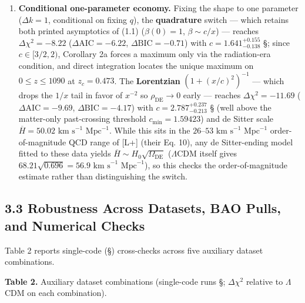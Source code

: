 \documentclass[11pt,a4paper]{article}
\begin{document}
\begin{enumerate}
\item{} {\bfseries\boldmath Conditional one-parameter economy.} Fixing the shape to one parameter ($\Delta k = 1$, conditional on fixing $q$), the {\bfseries\boldmath quadrature} switch --- which retains both printed asymptotics of (1.1) ($\beta(0) = 1$, $\beta \sim c/x$) --- reaches $\Delta\chi^2 = -8.22$ ($\Delta\text{AIC} = -6.22$, $\Delta\text{BIC} = -0.71$) with $c = 1.641^{+0.155}_{-0.138}$ \S{}; since $c \in [3/2, 2)$, Corollary 2a forces a maximum only via the radiation-era condition, and direct integration locates the unique maximum on $0 \le z \le 1090$ at $z_c = 0.473$. The {\bfseries\boldmath Lorentzian} $(1 + (x/c)^2)^{-1}$ --- which drops the $1/x$ tail in favor of $x^{-2}$ so $\rho_{\text{DE}} \to 0$ early --- reaches $\Delta\chi^2 = -11.69$ ($\Delta\text{AIC} = -9.69$, $\Delta\text{BIC} = -4.17$) with $c = 2.787^{+0.237}_{-0.213}$ \S{} (well above the matter-only past-crossing threshold $c_{\min} = 1.59423$) and de Sitter scale $\overline{H} = 50.02\text{ km s}^{-1}\text{ Mpc}^{-1}$. While this sits in the $26\text{--}53\text{ km s}^{-1}\text{ Mpc}^{-1}$ order-of-magnitude QCD range of [L+] (their Eq. 10), any de Sitter-ending model fitted to these data yields $\overline{H} \sim H_0\sqrt{\Omega_{\text{DE}}}$ ($\Lambda$CDM itself gives $68.21\sqrt{0.696} = 56.9\text{ km s}^{-1}\text{ Mpc}^{-1}$), so this checks the order-of-magnitude estimate rather than distinguishing the switch.
\end{enumerate}


\subsection*{3.3 Robustness Across Datasets, BAO Pulls, and Numerical Checks}
Table 2 reports single-code (\S{}) cross-checks across five auxiliary dataset combinations.

{\bfseries\boldmath Table 2.} Auxiliary dataset combinations (single-code runs \S{}; $\Delta\chi^2$ relative to $\Lambda$CDM on each combination).
\end{document}
